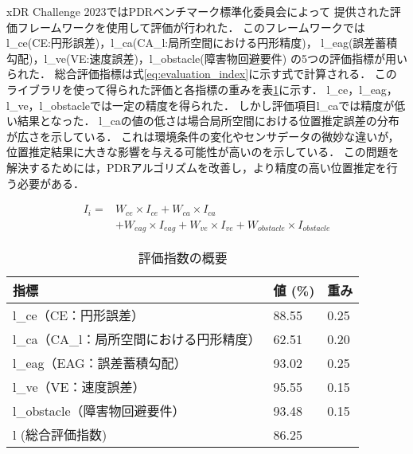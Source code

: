 xDR Challenge 2023ではPDRベンチマーク標準化委員会によって
提供された評価フレームワークを使用して評価が行われた．
このフレームワークではl\_ce(CE:円形誤差)，l\_ca(CA\_l:局所空間における円形精度)，
l\_eag(誤差蓄積勾配)，l\_ve(VE:速度誤差)，l\_obstacle(障害物回避要件)
の5つの評価指標が用いられた．
総合評価指標は式\ref{eq:evaluation_index}に示す式で計算される．
このライブラリを使って得られた評価と各指標の重みを表\ref{table:evaluation_index}に示す．
l\_ce，l\_eag， l\_ve，l\_obstacleでは一定の精度を得られた．
しかし評価項目l\_caでは精度が低い結果となった．
l\_caの値の低さは場合局所空間における位置推定誤差の分布が広さを示している．
これは環境条件の変化やセンサデータの微妙な違いが，位置推定結果に大きな影響を与える可能性が高いのを示している．
この問題を解決するためには，PDRアルゴリズムを改善し，より精度の高い位置推定を行う必要がある．

\begin{equation}
	\begin{aligned}
		I_i = & W_{ce} \times I_{ce} + W_{ca} \times I_{ca}                                        \\
		      & + W_{eag} \times I_{eag} + W_{ve} \times I_{ve} + W_{obstacle} \times I_{obstacle}
	\end{aligned}
	\label{eq:evaluation_index}
\end{equation}

\begin{table}[ht]
	\caption{評価指数の概要}
	\centering
	\begin{tabular}{l|l|l}
		\hline
		指標                        & 値 (\%) & 重み   \\ \hline
		l\_ce（CE：円形誤差）            & 88.55  & 0.25 \\
		l\_ca（CA\_l：局所空間における円形精度） & 62.51  & 0.20 \\
		l\_eag（EAG：誤差蓄積勾配）        & 93.02  & 0.25 \\
		l\_ve（VE：速度誤差）            & 95.55  & 0.15 \\
		l\_obstacle（障害物回避要件）      & 93.48  & 0.15 \\
		l (総合評価指数)                & 86.25  &      \\ \hline
	\end{tabular}
	\label{table:evaluation_index}
\end{table}
